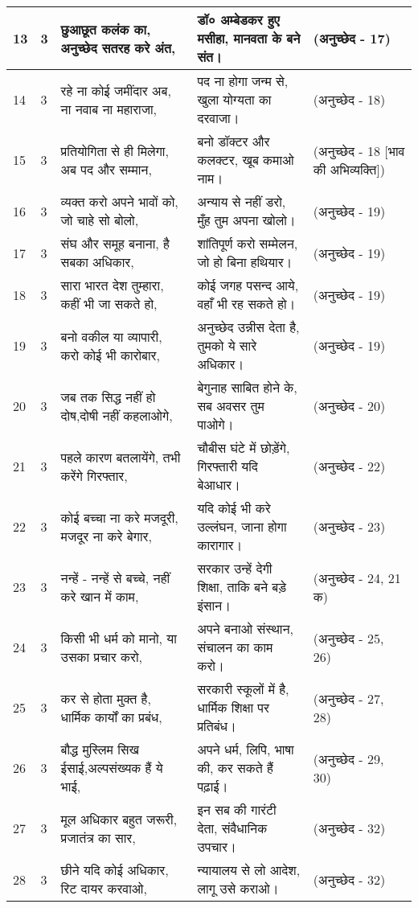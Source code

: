 \begin{longtable}{|l|l|l|l|l|}
13 & 3 & छुआछूत कलंक का, अनुच्छेद सतरह करे अंत, & डॉ० अम्बेडकर हुए मसीहा, मानवता के बने संत। & (अनुच्छेद - 17) \\ \hline 
14 & 3 & रहे ना कोई जमींदार अब, ना नवाब ना महाराजा, & पद ना होगा जन्म से, खुला योग्यता का दरवाजा। & (अनुच्छेद - 18) \\ \hline 
15 & 3 & प्रतियोगिता से ही मिलेगा, अब पद और सम्मान, & बनो डॉक्टर और कलक्टर, खूब कमाओ नाम। & (अनुच्छेद - 18 [भाव की अभिव्यक्ति]) \\ \hline 
16 & 3 & व्यक्त करो अपने भावों को, जो चाहे सो बोलो, & अन्याय से नहीं डरो, मुँह तुम अपना खोलो। & (अनुच्छेद - 19) \\ \hline 
17 & 3 & संघ और समूह बनाना, है सबका अधिकार, & शांतिपूर्ण करो सम्मेलन, जो हो बिना हथियार। & (अनुच्छेद - 19) \\ \hline 
18 & 3 & सारा भारत देश तुम्हारा, कहीं भी जा सकते हो, & कोई जगह पसन्द आये, वहाँ भी रह सकते हो। & (अनुच्छेद - 19) \\ \hline 
19 & 3 & बनो वकील या व्यापारी, करो कोई भी कारोबार, & अनुच्छेद उन्नीस देता है, तुमको ये सारे अधिकार। & (अनुच्छेद - 19) \\ \hline 
20 & 3 & जब तक सिद्ध नहीं हो दोष,दोषी नहीं कहलाओगे, & बेगुनाह साबित होने के, सब अवसर तुम पाओगे। & (अनुच्छेद - 20) \\ \hline 
21 & 3 & पहले कारण बतलायेंगे, तभी करेंगे गिरफ्तार, & चौबीस घंटे में छोड़ेंगे, गिरफ्तारी यदि बेआधार। & (अनुच्छेद - 22) \\ \hline 
22 & 3 & कोई बच्चा ना करे मजदूरी, मजदूर ना करे बेगार, & यदि कोई भी करे उल्लंघन, जाना होगा कारागार। & (अनुच्छेद - 23) \\ \hline 
23 & 3 & नन्हें - नन्हें से बच्चे, नहीं करे खान में काम, & सरकार उन्हें देगी शिक्षा, ताकि बने बड़े इंसान। & (अनुच्छेद - 24, 21 क) \\ \hline 
24 & 3 & किसी भी धर्म को मानो, या उसका प्रचार करो, & अपने बनाओ संस्थान, संचालन का काम करो। & (अनुच्छेद - 25, 26) \\ \hline 
25 & 3 & कर से होता मुक्त है, धार्मिक कार्यों का प्रबंध, & सरकारी स्कूलों में है, धार्मिक शिक्षा पर प्रतिबंध। & (अनुच्छेद - 27, 28) \\ \hline 
26 & 3 & बौद्ध मुस्लिम सिख ईसाई,अल्पसंख्यक हैं ये भाई, & अपने धर्म, लिपि, भाषा की, कर सकते हैं पढ़ाई। & (अनुच्छेद - 29, 30) \\ \hline 
27 & 3 & मूल अधिकार बहुत जरूरी, प्रजातंत्र का सार, & इन सब की गारंटी देता, संवैधानिक उपचार। & (अनुच्छेद - 32) \\ \hline 
28 & 3 & छीने यदि कोई अधिकार, रिट दायर करवाओ, & न्यायालय से लो आदेश, लागू उसे कराओ। & (अनुच्छेद - 32) \\ \hline 

\end{longtable}
